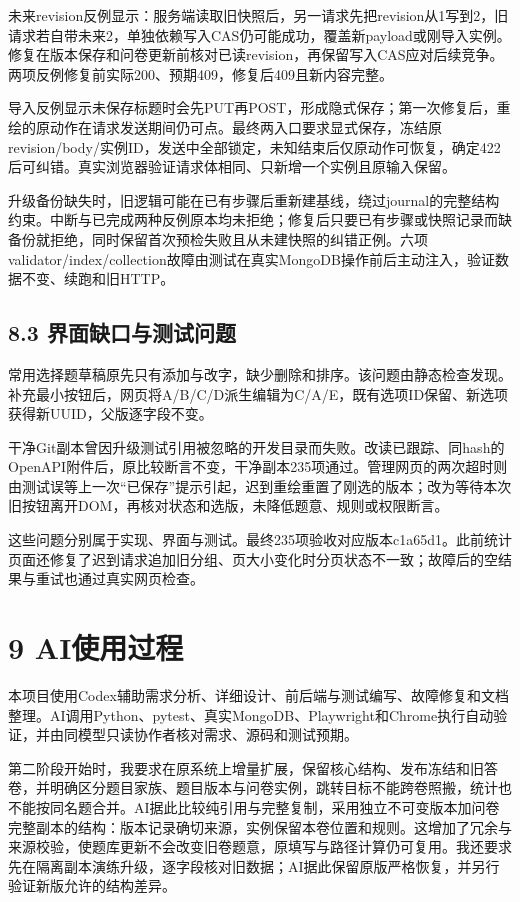 未来revision反例显示：服务端读取旧快照后，另一请求先把revision从1写到2，旧请求若自带未来2，单独依赖写入CAS仍可能成功，覆盖新payload或刚导入实例。修复在版本保存和问卷更新前核对已读revision，再保留写入CAS应对后续竞争。两项反例修复前实际200、预期409，修复后409且新内容完整。

导入反例显示未保存标题时会先PUT再POST，形成隐式保存；第一次修复后，重绘的原动作在请求发送期间仍可点。最终两入口要求显式保存，冻结原revision/body/实例ID，发送中全部锁定，未知结束后仅原动作可恢复，确定422后可纠错。真实浏览器验证请求体相同、只新增一个实例且原输入保留。

升级备份缺失时，旧逻辑可能在已有步骤后重新建基线，绕过journal的完整结构约束。中断与已完成两种反例原本均未拒绝；修复后只要已有步骤或快照记录而缺备份就拒绝，同时保留首次预检失败且从未建快照的纠错正例。六项validator/index/collection故障由测试在真实MongoDB操作前后主动注入，验证数据不变、续跑和旧HTTP。

\subsection{8.3 界面缺口与测试问题}\label{ux754cux9762ux7f3aux53e3ux4e0eux6d4bux8bd5ux95eeux9898}

常用选择题草稿原先只有添加与改字，缺少删除和排序。该问题由静态检查发现。补充最小按钮后，网页将A/B/C/D派生编辑为C/A/E，既有选项ID保留、新选项获得新UUID，父版逐字段不变。

干净Git副本曾因升级测试引用被忽略的开发目录而失败。改读已跟踪、同hash的OpenAPI附件后，原比较断言不变，干净副本235项通过。管理网页的两次超时则由测试误等上一次``已保存''提示引起，迟到重绘重置了刚选的版本；改为等待本次旧按钮离开DOM，再核对状态和选版，未降低题意、规则或权限断言。

这些问题分别属于实现、界面与测试。最终235项验收对应版本c1a65d1。此前统计页面还修复了迟到请求追加旧分组、页大小变化时分页状态不一致；故障后的空结果与重试也通过真实网页检查。

\section{9 AI使用过程}\label{aiux4f7fux7528ux8fc7ux7a0b}

本项目使用Codex辅助需求分析、详细设计、前后端与测试编写、故障修复和文档整理。AI调用Python、pytest、真实MongoDB、Playwright和Chrome执行自动验证，并由同模型只读协作者核对需求、源码和测试预期。

第二阶段开始时，我要求在原系统上增量扩展，保留核心结构、发布冻结和旧答卷，并明确区分题目家族、题目版本与问卷实例，跳转目标不能跨卷照搬，统计也不能按同名题合并。AI据此比较纯引用与完整复制，采用独立不可变版本加问卷完整副本的结构：版本记录确切来源，实例保留本卷位置和规则。这增加了冗余与来源校验，使题库更新不会改变旧卷题意，原填写与路径计算仍可复用。我还要求先在隔离副本演练升级，逐字段核对旧数据；AI据此保留原版严格恢复，并另行验证新版允许的结构差异。

